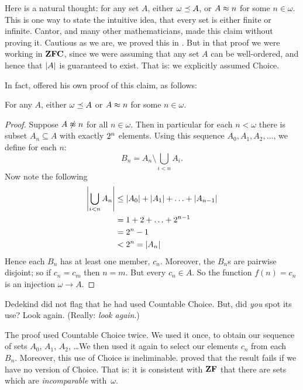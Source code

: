 \documentclass[../../../include/open-logic-section]{subfiles}
\begin{document}
\begin{ex}
Here is a natural thought: for any set $A$, either
$\omega \preceq A$, or $A \approx n$ for some $n \in \omega$. This
is one way to state the intuitive idea, that every set is either
finite or infinite. Cantor, and many other mathematicians, made this
claim without proving it. Cautious as we are, we proved this in
. But
in that proof we were working in $\mathbf{ZFC}$, since we were assuming that
any set $A$ can be well-ordered, and hence that $\left| A \right|$ is
guaranteed to exist. That is: we explicitly assumed Choice.

In fact, \citet{Dedekind1888} offered his own proof of
this claim, as follows:

\begin{thm}
For any $A$, either $\omega \preceq A$ or $A \approx n$ for some
$n \in \omega$.
\end{thm}

\begin{proof}
Suppose $A \not\approx n$ for all $n \in \omega$. Then in particular
for each $n < \omega$ there is subset $A_n \subseteq A$ with exactly
$2^{n}$ elements. Using this sequence $A_0, A_1, A_2,
\ldots$, we define for each $n$:
\[
	B_n = A_n \setminus \bigcup_{i < n} A_i.
\]
Now note the following
\begin{align*}
	\left| \bigcup_{i < n}A_n \right| 
	&\leq \left| A_0 \right| + \left| A_1 \right| + \ldots + \left| A_{n-1} \right|\\
	&=1 + 2 + \ldots + 2^{n-1}\\
	& = 2^n - 1\\
	& < 2^n = \left| A_n \right|
\end{align*}
Hence each $B_n$ has at least one member, $c_n$. Moreover, the $B_n$s
are pairwise disjoint; so if $c_n = c_m$ then $n = m$. But every $c_n
\in A$. So the function  $f(n) = c_n$ is an injection $\omega \to A$.
\end{proof}
\noindent 
Dedekind did not flag that he had used Countable Choice. But, did
\emph{you} spot its use? Look again. (Really: \emph{look again}.)

The proof used Countable Choice twice. We used it once, to obtain
our sequence of sets $A_0$, $A_1$, $A_2$, \dots\@ We then used it
again to select our elements $c_n$ from each~$B_n$. Moreover, this use
of Choice is ineliminable. \citet[p.~138]{Cohen1966} proved that the
result fails if we have no version of Choice. That is: it is
consistent with $\mathbf{ZF}$ that there are sets which are
\emph{incomparable} with~$\omega$.
\end{ex}
\end{document}
